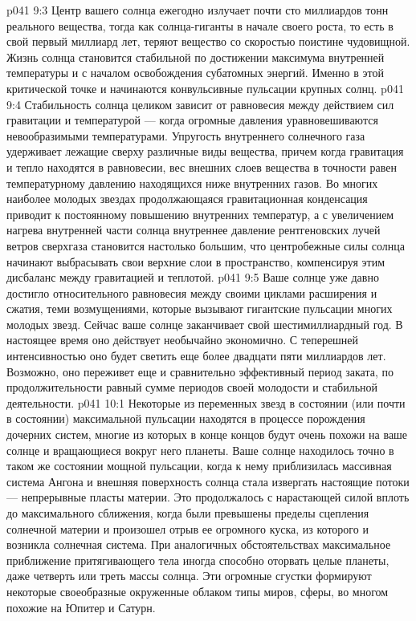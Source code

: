 \vs p041 9:3 \pc Центр вашего солнца ежегодно излучает почти сто миллиардов тонн реального вещества, тогда как солнца\hyp{}гиганты в начале своего роста, то есть в свой первый миллиард лет, теряют вещество со скоростью поистине чудовищной. Жизнь солнца становится стабильной по достижении максимума внутренней температуры и с началом освобождения субатомных энергий. Именно в этой критической точке и начинаются конвульсивные пульсации крупных солнц.
\vs p041 9:4 Стабильность солнца целиком зависит от равновесия между действием сил гравитации и температурой --- когда огромные давления уравновешиваются невообразимыми температурами. Упругость внутреннего солнечного газа удерживает лежащие сверху различные виды вещества, причем когда гравитация и тепло находятся в равновесии, вес внешних слоев вещества в точности равен температурному давлению находящихся ниже внутренних газов. Во многих наиболее молодых звездах продолжающаяся гравитационная конденсация приводит к постоянному повышению внутренних температур, а с увеличением нагрева внутренней части солнца внутреннее давление рентгеновских лучей ветров сверхгаза становится настолько большим, что центробежные силы солнца начинают выбрасывать свои верхние слои в пространство, компенсируя этим дисбаланс между гравитацией и теплотой.
\vs p041 9:5 Ваше солнце уже давно достигло относительного равновесия между своими циклами расширения и сжатия, теми возмущениями, которые вызывают гигантские пульсации многих молодых звезд. Сейчас ваше солнце заканчивает свой шестимиллиардный год. В настоящее время оно действует необычайно экономично. С теперешней интенсивностью оно будет светить еще более двадцати пяти миллиардов лет. Возможно, оно переживет еще и сравнительно эффективный период заката, по продолжительности равный сумме периодов своей молодости и стабильной деятельности.
\vs p041 10:1 Некоторые из переменных звезд в состоянии (или почти в состоянии) максимальной пульсации находятся в процессе порождения дочерних систем, многие из которых в конце концов будут очень похожи на ваше солнце и вращающиеся вокруг него планеты. Ваше солнце находилось точно в таком же состоянии мощной пульсации, когда к нему приблизилась массивная система Ангона и внешняя поверхность солнца стала извергать настоящие потоки --- непрерывные пласты материи. Это продолжалось с нарастающей силой вплоть до максимального сближения, когда были превышены пределы сцепления солнечной материи и произошел отрыв ее огромного куска, из которого и возникла солнечная система. При аналогичных обстоятельствах максимальное приближение притягивающего тела иногда способно оторвать целые планеты, даже четверть или треть массы солнца. Эти огромные сгустки формируют некоторые своеобразные окруженные облаком типы миров, сферы, во многом похожие на Юпитер и Сатурн.
